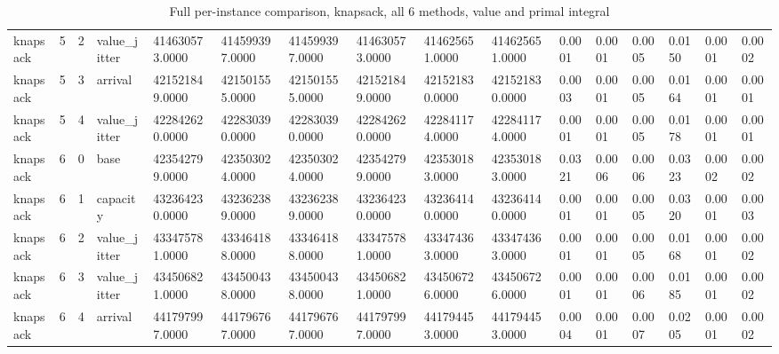 \begin{table}[t]
\begin{tabular}{llllllllllllllll}
knapsack & 5 & 2 & value\_jitter & 414630573.0000 & 414599397.0000 & 414599397.0000 & 414630573.0000 & 414625651.0000 & 414625651.0000 & 0.0001 & 0.0001 & 0.0005 & 0.0150 & 0.0001 & 0.0002 \\
knapsack & 5 & 3 & arrival & 421521849.0000 & 421501555.0000 & 421501555.0000 & 421521849.0000 & 421521830.0000 & 421521830.0000 & 0.0003 & 0.0001 & 0.0005 & 0.0164 & 0.0001 & 0.0001 \\
knapsack & 5 & 4 & value\_jitter & 422842620.0000 & 422830390.0000 & 422830390.0000 & 422842620.0000 & 422841174.0000 & 422841174.0000 & 0.0001 & 0.0001 & 0.0005 & 0.0178 & 0.0001 & 0.0001 \\
knapsack & 6 & 0 & base & 423542799.0000 & 423503024.0000 & 423503024.0000 & 423542799.0000 & 423530183.0000 & 423530183.0000 & 0.0321 & 0.0006 & 0.0006 & 0.0323 & 0.0002 & 0.0002 \\
knapsack & 6 & 1 & capacity & 432364230.0000 & 432362389.0000 & 432362389.0000 & 432364230.0000 & 432364140.0000 & 432364140.0000 & 0.0001 & 0.0001 & 0.0005 & 0.0320 & 0.0001 & 0.0003 \\
knapsack & 6 & 2 & value\_jitter & 433475781.0000 & 433464188.0000 & 433464188.0000 & 433475781.0000 & 433474363.0000 & 433474363.0000 & 0.0001 & 0.0001 & 0.0005 & 0.0168 & 0.0001 & 0.0002 \\
knapsack & 6 & 3 & value\_jitter & 434506821.0000 & 434500438.0000 & 434500438.0000 & 434506821.0000 & 434506726.0000 & 434506726.0000 & 0.0001 & 0.0001 & 0.0006 & 0.0185 & 0.0001 & 0.0002 \\
knapsack & 6 & 4 & arrival & 441797997.0000 & 441796767.0000 & 441796767.0000 & 441797997.0000 & 441794453.0000 & 441794453.0000 & 0.0004 & 0.0001 & 0.0007 & 0.0205 & 0.0001 & 0.0002 \\
\bottomrule
\end{tabular}
\caption{Full per-instance comparison, knapsack, all 6 methods, value and primal integral}
\label{tab:multisolver-full-knapsack}
\end{table}
